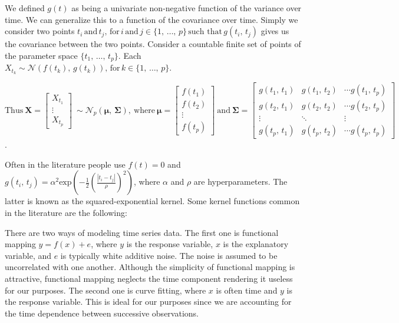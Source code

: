 \documentclass[a4paper, 10pt]{article}
\begin{document}
\begin{flushleft}
   We defined $g(t)$ as being a univariate non-negative function of the variance over time. We can generalize this to a function of the covariance over time. Simply we consider two points $t_{i} \, \text{and} \, t_{j}, \, \text{for} \, i \, \text{and} \, j \in \{1, \, \ldots, \, p\} \, \text{such that} \, g(t_{i}, \, t_{j})$ gives us the covariance between the two points. Consider a countable finite set of points of the parameter space $\{t_{1}, \, \ldots, \, t_{p}\}$. Each $X_{t_{k}} \sim \mathcal{N}(f(t_{k}), \, g(t_{k})), \, \text{for} \, k \in \{1,\, \ldots,\, p\}$.

   $
   \text{Thus}
   \:
   \mathbf{X} =
   \begin{bmatrix}
      X_{t_{1}} \\
      \vdots \\
      X_{t_{p}}
   \end{bmatrix}
   \:
   \sim \mathcal{N}_{p}(\boldsymbol{\mu}, \, \boldsymbol{\Sigma}),
   \:
   \text{where}
   \:
   \boldsymbol{\mu} = 
   \begin{bmatrix}
      f(t_{1}) \\
      f(t_{2}) \\
      \vdots \\
      f(t_{p})
   \end{bmatrix}  
   \: 
   \text{and}
   \:
   \boldsymbol{\Sigma} = 
   \begin{bmatrix}
      g(t_{1}, \, t_{1}) & g(t_{1}, \, t_{2}) & \cdots g(t_{1}, \, t_{p}) \\
      g(t_{2}, \, t_{1}) & g(t_{2}, \, t_{2}) & \cdots g(t_{2}, \, t_{p}) \\
      \vdots & \ddots & \vdots \\
      g(t_{p}, \, t_{1}) & g(t_{p}, \, t_{2}) & \cdots g(t_{p}, \, t_{p})
   \end{bmatrix}$.

   \vspace{1em}
   
   Often in the literature people use $f(t) = 0$ and $g(t_{i}, \, t_{j}) = \alpha^{2} \text{exp}(- \frac{1}{2} (\frac{|t_i - t_j|}{\rho})^2)$, where $\alpha$ and $\rho$ are hyperparameters. The latter is known as the squared-exponential kernel. Some kernel functions common in the literature are the following:

   \vspace{1em}
   
   There are two ways of modeling time series data. The first one is functional mapping $y = f(x) + e$, where $y$ is the response variable, $x$ is the explanatory variable, and $e$ is typically white additive noise. The noise is assumed to be uncorrelated with one another. Although the simplicity of functional mapping is attractive, functional mapping neglects the time component rendering it useless for our purposes. The second one is curve fitting, where $x$ is often time and $y$ is the response variable. This is ideal for our purposes since we are accounting for the time dependence between successive observations. 


\end{flushleft}
\end{document}
